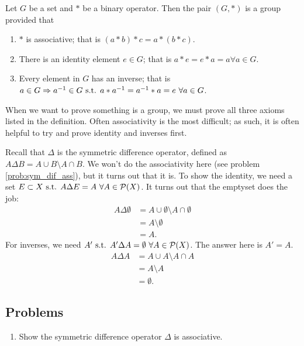 \begin{definition}{}
	Let $G$ be a set and $*$ be a binary operator. Then the pair $(G,*)$ is a group provided that
	\begin{enumerate}
		\item $*$ is associative; that is $(a*b)*c=a*(b*c)$.
		\item There is an identity element $e\in G$; that is $a*e=e*a=a \forall a\in G$.
		\item Every element in $G$ has an inverse; that is $a\in G\Rightarrow a^{-1}\in G \text{ s.t. } a*a^{-1}=a^{-1}*a=e\ \forall a\in G$.
	\end{enumerate}
\end{definition}
When we want to prove something is a group, we must prove all three axioms listed in the definition. Often associativity is the most difficult; as such, it is often helpful to try and prove identity and inverses first.
\begin{example}{}
    Recall that $\Delta$ is the symmetric difference operator, defined as $A\Delta B= A\cup B\setminus A\cap B$. We won't do the associativity here (see problem \ref{prob:sym_dif_ass}), but it turns out that it is. To show the identity, we need a set $E\subset X \text{ s.t. } A\Delta E=A\ \forall A\in\mathcal{P}(X)$. It turns out that the emptyset does the job:
    \begin{align*}
        A\Delta \emptyset &= A\cup\emptyset \setminus A\cap\emptyset\\
        &= A \setminus \emptyset\\
        &= A.
    \end{align*}
    For inverses, we need $A'\text{ s.t. } A'\Delta A=\emptyset\ \forall A\in\mathcal{P}(X)$. The answer here is $A'=A$.
    \begin{align*}
        A \Delta A &= A \cup A \setminus A\cap A\\
        &= A \setminus A\\
        &= \emptyset.
    \end{align*}
\end{example}

\subsection*{Problems}
\begin{enumerate}
    \item Show the symmetric difference operator $\Delta$ is associative.\label{prob:sym_dif_ass}
\end{enumerate}
